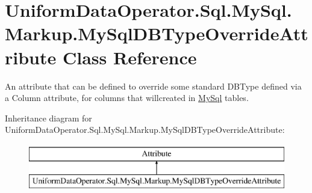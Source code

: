\hypertarget{class_uniform_data_operator_1_1_sql_1_1_my_sql_1_1_markup_1_1_my_sql_d_b_type_override_attribute}{}\section{Uniform\+Data\+Operator.\+Sql.\+My\+Sql.\+Markup.\+My\+Sql\+D\+B\+Type\+Override\+Attribute Class Reference}
\label{class_uniform_data_operator_1_1_sql_1_1_my_sql_1_1_markup_1_1_my_sql_d_b_type_override_attribute}


An attribute that can be defined to override some standard {\ttfamily D\+B\+Type} defined via a {\ttfamily Column} attribute, for columns that willcreated in \mbox{\hyperlink{namespace_uniform_data_operator_1_1_sql_1_1_my_sql}{My\+Sql}} tables.  


Inheritance diagram for Uniform\+Data\+Operator.\+Sql.\+My\+Sql.\+Markup.\+My\+Sql\+D\+B\+Type\+Override\+Attribute\+:\begin{figure}[H]
\begin{center}
\leavevmode
\includegraphics[height=2.000000cm]{da/d96/class_uniform_data_operator_1_1_sql_1_1_my_sql_1_1_markup_1_1_my_sql_d_b_type_override_attribute}
\end{center}
\end{figure}
